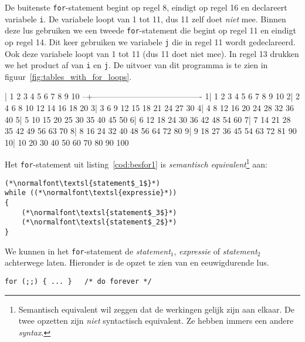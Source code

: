 
De buitenste \texttt{for}-statement begint op regel 8, eindigt op regel 16 en declareert variabele \texttt{i}. De variabele loopt van 1 tot 11, dus 11 zelf doet \textsl{niet} mee. Binnen deze lus gebruiken we een tweede \texttt{for}-statement die begint op regel 11 en eindigt op regel 14. Dit keer gebruiken we variabele \texttt{j} die in regel 11 wordt gedeclareerd. Ook deze variabele loopt van 1 tot 11 (dus 11 doet niet mee). In regel 13 drukken we het product af van \texttt{i} en \texttt{j}. De uitvoer van dit programma is te zien in figuur~\ref{fig:tables_with_for_loops}.

\begin{dosbox}[title=Uitvoer van het programma in listing~\ref{cod:tables_with_for_loops}.,label=fig:tables_with_for_loops]
  |   1   2   3   4   5   6   7   8   9  10
--+----------------------------------------
 1|   1   2   3   4   5   6   7   8   9  10
 2|   2   4   6   8  10  12  14  16  18  20
 3|   3   6   9  12  15  18  21  24  27  30
 4|   4   8  12  16  20  24  28  32  36  40
 5|   5  10  15  20  25  30  35  40  45  50
 6|   6  12  18  24  30  36  42  48  54  60
 7|   7  14  21  28  35  42  49  56  63  70
 8|   8  16  24  32  40  48  56  64  72  80
 9|   9  18  27  36  45  54  63  72  81  90
10|  10  20  30  40  50  60  70  80  90 100
\end{dosbox}

Het \texttt{for}-statement uit listing~\ref{cod:besfor1} is \textsl{semantisch equivalent}\footnote{Semantisch equivalent wil zeggen dat de werkingen gelijk zijn aan elkaar. De twee opzetten zijn \textsl{niet} syntactisch equivalent. Ze hebben immers een andere \textsl{syntax}.} aan:

\begin{lstlisting}[caption=\texttt{while}-statement als \texttt{for}-statement.,label=cod:besforaswhile]
(*\normalfont\textsl{statement$_1$}*)
while ((*\normalfont\textsl{expressie}*))
{
    (*\normalfont\textsl{statement$_3$}*)
    (*\normalfont\textsl{statement$_2$}*)
}
\end{lstlisting}

We kunnen in het \texttt{for}-statement de \textsl{statement}$_1$, \textsl{expressie} of \textsl{statement}$_2$ achterwege laten. Hieronder is de opzet te zien van en eeuwigdurende lus.

\hspace*{1em}\texttt{for (;;) \{ ... \}\ \ \    /* do forever */}


